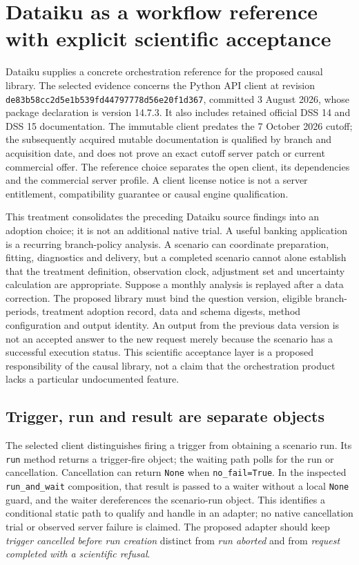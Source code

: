 \section{Dataiku as a workflow reference with explicit scientific acceptance}
\label{sec:exec25-dataiku-reuse}
Dataiku supplies a concrete orchestration reference for the proposed causal
library. The selected evidence concerns the Python API client at revision
\texttt{de83b58cc2d5e1b539fd}\allowbreak\texttt{44797778d56e20f1d367},
committed 3 August 2026, whose package declaration is version 14.7.3. It also
includes retained official DSS 14 and DSS 15 documentation. The immutable
client predates the 7 October 2026 cutoff; the subsequently acquired mutable
documentation is qualified by branch and acquisition date, and does not prove
an exact cutoff server patch or current commercial offer. The reference choice
separates the open client, its dependencies and the commercial server profile.
A client license notice is not a server entitlement, compatibility guarantee
or causal engine qualification.~\citep{exec24_workflow_contracts_dataiku,exec23_dss_dss14_flow,exec23_dss_dss14_releases,exec23_dss_latest_flow,exec23_dss_latest_releases}

This treatment consolidates the preceding Dataiku source findings into an adoption choice; it is not an additional native trial. A useful banking application is a recurring branch-policy analysis. A scenario
can coordinate preparation, fitting, diagnostics and delivery, but a completed
scenario cannot alone establish that the treatment definition, observation
clock, adjustment set and uncertainty calculation are appropriate. Suppose a
monthly analysis is replayed after a data correction. The proposed library
must bind the question version, eligible branch-periods, treatment adoption
record, data and schema digests, method configuration and output identity.
An output from the previous data version is not an accepted answer to the new
request merely because the scenario has a successful execution status. This
scientific acceptance layer is a proposed responsibility of the causal library,
not a claim that the orchestration product lacks a particular undocumented
feature.~\citep{exec25_dataiku_choice}

\subsection{Trigger, run and result are separate objects}
The selected client distinguishes firing a trigger from obtaining a scenario
run. Its \texttt{run} method returns a trigger-fire object; the waiting path
polls for the run or cancellation. Cancellation can return \texttt{None} when
\texttt{no\_fail=True}. In the inspected \texttt{run\_and\_wait} composition,
that result is passed to a waiter without a local \texttt{None} guard, and the
waiter dereferences the scenario-run object. This identifies a conditional
static path to qualify and handle in an adapter; no native cancellation trial
or observed server failure is claimed. The proposed adapter should keep
\emph{trigger cancelled before run creation} distinct from \emph{run aborted}
and from \emph{request completed with a scientific refusal}.~\citep{exec24_workflow_contracts_dataiku}


